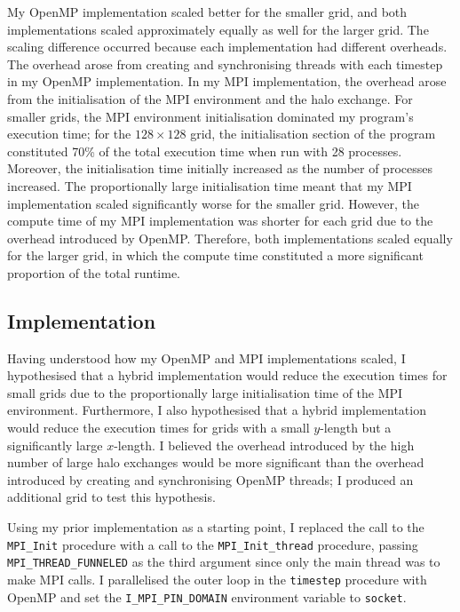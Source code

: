 \documentclass[twocolumn, a4paper]{article}
\begin{document}
My OpenMP implementation scaled better for the smaller grid, and both implementations scaled approximately equally as well for the larger grid.
The scaling difference occurred because each implementation had different overheads.
The overhead arose from creating and synchronising threads with each timestep in my OpenMP implementation.
In my MPI implementation, the overhead arose from the initialisation of the MPI environment and the halo exchange.
For smaller grids, the MPI environment initialisation dominated my program's execution time; for the $128 \times 128$ grid, the initialisation section of the program constituted 70\% of the total execution time when run with 28 processes.
Moreover, the initialisation time initially increased as the number of processes increased.
The proportionally large initialisation time meant that my MPI implementation scaled significantly worse for the smaller grid.
However, the compute time of my MPI implementation was shorter for each grid due to the overhead introduced by OpenMP.
Therefore, both implementations scaled equally for the larger grid, in which the compute time constituted a more significant proportion of the total runtime.

\subsection{Implementation}

Having understood how my OpenMP and MPI implementations scaled, I hypothesised that a hybrid implementation would reduce the execution times for small grids due to the proportionally large initialisation time of the MPI environment.
Furthermore, I also hypothesised that a hybrid implementation would reduce the execution times for grids with a small $y$-length but a significantly large $x$-length.
I believed the overhead introduced by the high number of large halo exchanges would be more significant than the overhead introduced by creating and synchronising OpenMP threads; I produced an additional grid to test this hypothesis.

Using my prior implementation as a starting point, I replaced the call to the \texttt{MPI\_Init} procedure with a call to the \texttt{MPI\_Init\_thread} procedure, passing \texttt{MPI\_THREAD\_FUNNELED} as the third argument since only the main thread was to make MPI calls.
I parallelised the outer loop in the \texttt{timestep} procedure with OpenMP and set the \texttt{I\_MPI\_PIN\_DOMAIN} environment variable to \texttt{socket}.
\end{document}
